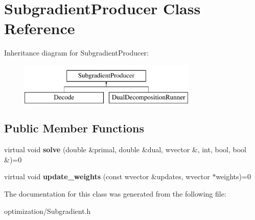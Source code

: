 \hypertarget{classSubgradientProducer}{
\section{SubgradientProducer Class Reference}
\label{classSubgradientProducer}
}
Inheritance diagram for SubgradientProducer:\begin{figure}[H]
\begin{center}
\leavevmode
\includegraphics[height=2cm]{classSubgradientProducer}
\end{center}
\end{figure}
\subsection*{Public Member Functions}
\begin{DoxyCompactItemize}
\item 
\hypertarget{classSubgradientProducer_acea0e6ef35f9f3fd2f14872740471628}{
virtual void {\bfseries solve} (double \&primal, double \&dual, wvector \&, int, bool, bool \&)=0}
\label{classSubgradientProducer_acea0e6ef35f9f3fd2f14872740471628}

\item 
\hypertarget{classSubgradientProducer_a5b471526b337913722f56221b2461d89}{
virtual void {\bfseries update\_\-weights} (const wvector \&updates, wvector $\ast$weights)=0}
\label{classSubgradientProducer_a5b471526b337913722f56221b2461d89}

\end{DoxyCompactItemize}


The documentation for this class was generated from the following file:\begin{DoxyCompactItemize}
\item 
optimization/Subgradient.h\end{DoxyCompactItemize}
